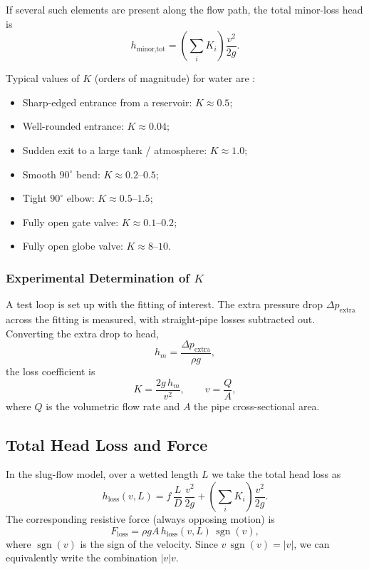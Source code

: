 \documentclass[11pt]{article}
\begin{document}
If several such elements are present along the flow path, the total minor-loss
head is
\[
h_{\text{minor,tot}} =
\left(\sum_i K_i\right)\frac{v^2}{2g}.
\]

Typical values of $K$ (orders of magnitude) for water are
\cite{white_fm,crane}:
\begin{itemize}
  \item Sharp-edged entrance from a reservoir: $K \approx 0.5$;
  \item Well-rounded entrance: $K \approx 0.04$;
  \item Sudden exit to a large tank / atmosphere: $K \approx 1.0$;
  \item Smooth $90^\circ$ bend: $K \approx 0.2$--$0.5$;
  \item Tight $90^\circ$ elbow: $K \approx 0.5$--$1.5$;
  \item Fully open gate valve: $K \approx 0.1$--$0.2$;
  \item Fully open globe valve: $K \approx 8$--$10$.
\end{itemize}

\subsubsection*{Experimental Determination of $K$}

A test loop is set up with the fitting of interest. The extra pressure drop
$\Delta p_{\text{extra}}$ across the fitting is measured, with straight-pipe
losses subtracted out. Converting the extra drop to head,
\[
h_m = \frac{\Delta p_{\text{extra}}}{\rho g},
\]
the loss coefficient is
\[
K = \frac{2g\,h_m}{v^2},
\qquad
v = \frac{Q}{A},
\]
where $Q$ is the volumetric flow rate and $A$ the pipe cross-sectional area.

\subsection{Total Head Loss and Force}

In the slug-flow model, over a wetted length $L$ we take the total head loss as
\begin{equation}
h_{\text{loss}}(v,L)
= f\,\frac{L}{D}\,\frac{v^2}{2g}
  + \left(\sum_i K_i\right)\frac{v^2}{2g}.
\end{equation}
The corresponding resistive force (always opposing motion) is
\begin{equation}
F_{\text{loss}} = \rho g A\,h_{\text{loss}}(v,L)\,\operatorname{sgn}(v),
\end{equation}
where $\operatorname{sgn}(v)$ is the sign of the velocity. Since
$v\,\operatorname{sgn}(v) = \lvert v\rvert$, we can equivalently write the
combination $|v|v$.
\end{document}
